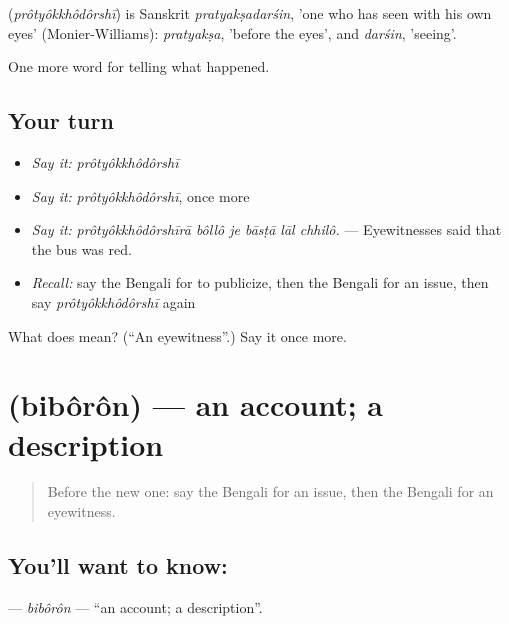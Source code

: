 \begin{cousinweb}
\textbf{} (\emph{prôtyôkkhôdôrshī}) is Sanskrit \emph{pratyakṣadarśin}, 'one who has seen with his own eyes' (Monier-Williams): \emph{pratyakṣa}, 'before the eyes', and \emph{darśin}, 'seeing'.
\end{cousinweb}

\begin{grammarlens}[title={What you've built}]
One more word for telling what happened.
\end{grammarlens}

\subsection*{Your turn}
\begin{itemize}
\raggedright
  \item \emph{Say it:} \emph{prôtyôkkhôdôrshī}
  \item \emph{Say it:} \emph{prôtyôkkhôdôrshī}, once more
  \item \emph{Say it:} \emph{prôtyôkkhôdôrshīrā bôllô je bāsṭā lāl chhilô.} — Eyewitnesses said that the bus was red.
  \item \emph{Recall:} say the Bengali for to publicize, then the Bengali for an issue, then say \emph{prôtyôkkhôdôrshī} again
\end{itemize}

\begin{tcolorbox}[breakable,colback=teal!4,colframe=teal!35!black,title={Before you move on}]
What does  mean? (\textquotedblleft{}An eyewitness\textquotedblright{}.) Say it once more.
\end{tcolorbox}
\section[\texorpdfstring{\bn{বিবরণ} (bibôrôn)}{বিবরণ (bibôrôn)}]{ (bibôrôn) — an account; a description}

\label{lesson:BN-C301-biboron}



\begin{quote}
Before the new one: say the Bengali for an issue, then the Bengali for an eyewitness.
\end{quote}

\subsection*{You'll want to know: }
\textbf{} — \emph{bibôrôn} — \textquotedblleft{}an account; a description\textquotedblright{}.

